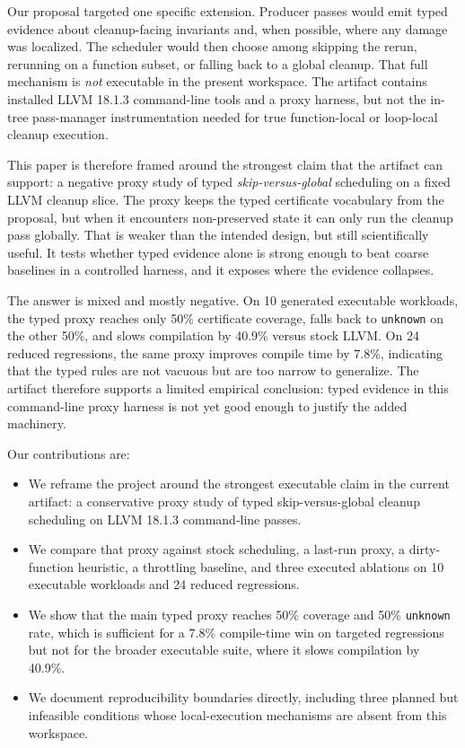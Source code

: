 \documentclass{article}
\begin{document}
Our proposal targeted one specific extension. Producer passes would emit typed evidence about cleanup-facing invariants and, when possible, where any damage was localized. The scheduler would then choose among skipping the rerun, rerunning on a function subset, or falling back to a global cleanup. That full mechanism is \emph{not} executable in the present workspace. The artifact contains installed LLVM 18.1.3 command-line tools and a proxy harness, but not the in-tree pass-manager instrumentation needed for true function-local or loop-local cleanup execution.

This paper is therefore framed around the strongest claim that the artifact can support: a negative proxy study of typed \emph{skip-versus-global} scheduling on a fixed LLVM cleanup slice. The proxy keeps the typed certificate vocabulary from the proposal, but when it encounters non-preserved state it can only run the cleanup pass globally. That is weaker than the intended design, but still scientifically useful. It tests whether typed evidence alone is strong enough to beat coarse baselines in a controlled harness, and it exposes where the evidence collapses.

The answer is mixed and mostly negative. On 10 generated executable workloads, the typed proxy reaches only 50\% certificate coverage, falls back to \texttt{unknown} on the other 50\%, and slows compilation by 40.9\% versus stock LLVM. On 24 reduced regressions, the same proxy improves compile time by 7.8\%, indicating that the typed rules are not vacuous but are too narrow to generalize. The artifact therefore supports a limited empirical conclusion: typed evidence in this command-line proxy harness is not yet good enough to justify the added machinery.

Our contributions are:
\begin{itemize}
  \item We reframe the project around the strongest executable claim in the current artifact: a conservative proxy study of typed skip-versus-global cleanup scheduling on LLVM 18.1.3 command-line passes.
  \item We compare that proxy against stock scheduling, a last-run proxy, a dirty-function heuristic, a throttling baseline, and three executed ablations on 10 executable workloads and 24 reduced regressions.
  \item We show that the main typed proxy reaches 50\% coverage and 50\% \texttt{unknown} rate, which is sufficient for a 7.8\% compile-time win on targeted regressions but not for the broader executable suite, where it slows compilation by 40.9\%.
  \item We document reproducibility boundaries directly, including three planned but infeasible conditions whose local-execution mechanisms are absent from this workspace.
\end{itemize}
\end{document}

